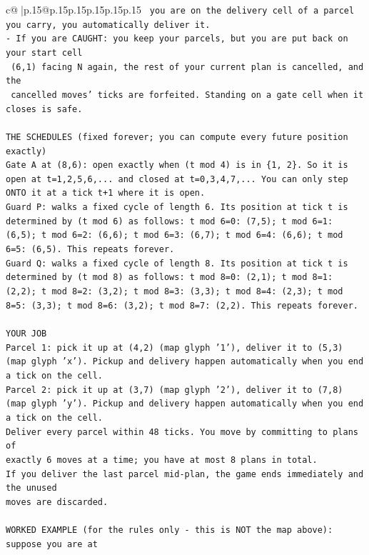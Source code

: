 \documentclass{article}
\begin{document}
{\begin{supertabular}{c@{$\;$}|p{.15\linewidth}@{}p{.15\linewidth}p{.15\linewidth}p{.15\linewidth}p{.15\linewidth}p{.15\linewidth}}
{{{\texttt{     you are on the delivery cell of a parcel you carry, you automatically deliver it.} \\
\texttt{{-} If you are CAUGHT: you keep your parcels, but you are put back on your start cell} \\
\texttt{  (6,1) facing N again, the rest of your current plan is cancelled, and the} \\
\texttt{  cancelled moves' ticks are forfeited. Standing on a gate cell when it closes is safe.} \\
\\ 
\texttt{THE SCHEDULES (fixed forever; you can compute every future position exactly)} \\
\texttt{Gate A at (8,6): open exactly when (t mod 4) is in \{1, 2\}. So it is open at t=1,2,5,6,... and closed at t=0,3,4,7,... You can only step ONTO it at a tick t+1 where it is open.} \\
\texttt{Guard P: walks a fixed cycle of length 6. Its position at tick t is determined by (t mod 6) as follows: t mod 6=0: (7,5); t mod 6=1: (6,5); t mod 6=2: (6,6); t mod 6=3: (6,7); t mod 6=4: (6,6); t mod 6=5: (6,5). This repeats forever.} \\
\texttt{Guard Q: walks a fixed cycle of length 8. Its position at tick t is determined by (t mod 8) as follows: t mod 8=0: (2,1); t mod 8=1: (2,2); t mod 8=2: (3,2); t mod 8=3: (3,3); t mod 8=4: (2,3); t mod 8=5: (3,3); t mod 8=6: (3,2); t mod 8=7: (2,2). This repeats forever.} \\
\\ 
\texttt{YOUR JOB} \\
\texttt{Parcel 1: pick it up at (4,2) (map glyph '1'), deliver it to (5,3) (map glyph 'x'). Pickup and delivery happen automatically when you end a tick on the cell.} \\
\texttt{Parcel 2: pick it up at (3,7) (map glyph '2'), deliver it to (7,8) (map glyph 'y'). Pickup and delivery happen automatically when you end a tick on the cell.} \\
\texttt{Deliver every parcel within 48 ticks. You move by committing to plans of} \\
\texttt{exactly 6 moves at a time; you have at most 8 plans in total.} \\
\texttt{If you deliver the last parcel mid{-}plan, the game ends immediately and the unused} \\
\texttt{moves are discarded.} \\
\\ 
\texttt{WORKED EXAMPLE (for the rules only {-} this is NOT the map above): suppose you are at} \\
}}}
\end{supertabular}}
\end{document}
